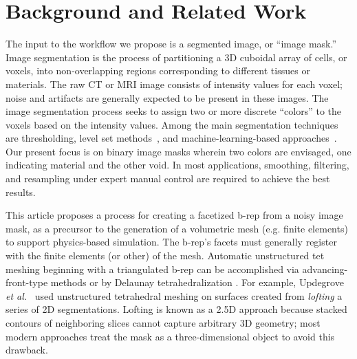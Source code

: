 \section{Background and Related Work}

The input to the workflow we propose is a segmented image, or ``image mask.''
Image segmentation is the process of partitioning a 3D cuboidal array of cells, or voxels, into non-overlapping regions corresponding to different tissues or materials.  The raw CT or MRI image consists of intensity values for each voxel; noise and artifacts are generally expected to be present in these images.  The image segmentation process seeks to assign two or more discrete ``colors'' to the voxels based on the intensity values.  Among the main segmentation techniques are thresholding, level set methods~\cite{malladi_1995, sethian_1996}, and machine-learning-based approaches~\cite{litjens_2017}.  Our present focus is on binary image masks wherein two colors are envisaged, one indicating material and the other void.  In most applications, smoothing, filtering, and resampling under expert manual control are required to achieve the best results.

This article proposes a process for creating a facetized b-rep from a noisy image mask, as a precursor to the generation of a volumetric mesh (e.g. finite elements) to support physics-based simulation.  The b-rep's facets must generally register with the finite elements (or other) of the mesh.  Automatic unstructured tet meshing beginning with a triangulated b-rep can be accomplished via advancing-front-type methods \cite{jin_1993, lohner_1988} or by Delaunay tetrahedralization \cite{lohner_1997}. For example, Updegrove \textit{et al.}~\cite{updegrove_2016} used unstructured tetrahedral meshing on surfaces created from \textit{lofting} a series of 2D segmentations. Lofting is known as a 2.5D approach because stacked contours of neighboring slices cannot capture arbitrary 3D geometry; most modern approaches treat the mask as a three-dimensional object to avoid this drawback.

